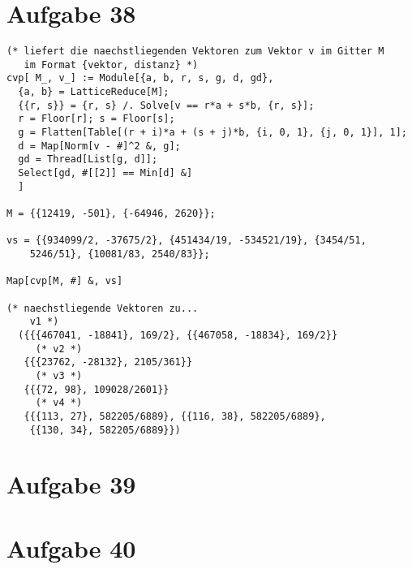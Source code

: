\section*{Aufgabe 38}
\begin{lstlisting}
(* liefert die naechstliegenden Vektoren zum Vektor v im Gitter M 
   im Format {vektor, distanz} *)
cvp[ M_, v_] := Module[{a, b, r, s, g, d, gd},
  {a, b} = LatticeReduce[M];
  {{r, s}} = {r, s} /. Solve[v == r*a + s*b, {r, s}];
  r = Floor[r]; s = Floor[s];
  g = Flatten[Table[(r + i)*a + (s + j)*b, {i, 0, 1}, {j, 0, 1}], 1];
  d = Map[Norm[v - #]^2 &, g];
  gd = Thread[List[g, d]];
  Select[gd, #[[2]] == Min[d] &]
  ]

M = {{12419, -501}, {-64946, 2620}};

vs = {{934099/2, -37675/2}, {451434/19, -534521/19}, {3454/51, 
    5246/51}, {10081/83, 2540/83}};

Map[cvp[M, #] &, vs]

(* naechstliegende Vektoren zu...
	v1 *)
  ({{{467041, -18841}, 169/2}, {{467058, -18834}, 169/2}}
     (* v2 *)
   {{{23762, -28132}, 2105/361}}
     (* v3 *)
   {{{72, 98}, 109028/2601}}
     (* v4 *)
   {{{113, 27}, 582205/6889}, {{116, 38}, 582205/6889},
   	{{130, 34}, 582205/6889}})
\end{lstlisting}

\section*{Aufgabe 39}

\section*{Aufgabe 40}

